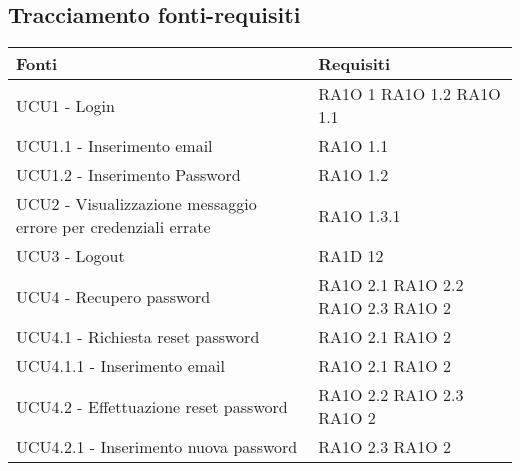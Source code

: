 \subsection{Tracciamento fonti-requisiti}
      \begin{center}
      \bgroup
      \def\arraystretch{1.8}
      \begin{longtable}{ | p{5cm} | p{5cm} |}
    
      \cellcolor[gray]{0.9} \textbf{Fonti} & \cellcolor[gray]{0.9} \textbf{Requisiti} \\ \hline       
            UCU1 - Login &  RA1O 1 \newline  RA1O 1.2 \newline  RA1O 1.1 \newline  \\ \hline      
            UCU1.1 - Inserimento email &  RA1O 1.1 \newline  \\ \hline      
            UCU1.2 - Inserimento Password &  RA1O 1.2 \newline  \\ \hline      
            UCU2 - Visualizzazione messaggio errore per credenziali errate &  RA1O 1.3.1 \newline  \\ \hline      
            UCU3 - Logout &  RA1D 12 \newline  \\ \hline      
            UCU4 - Recupero password &  RA1O 2.1 \newline  RA1O 2.2 \newline  RA1O 2.3 \newline  RA1O 2  \newline  \\ \hline      
            UCU4.1 - Richiesta reset password &  RA1O 2.1 \newline  RA1O 2  \newline  \\ \hline      
            UCU4.1.1 - Inserimento email &  RA1O 2.1 \newline  RA1O 2  \newline  \\ \hline      
            UCU4.2 - Effettuazione reset password &  RA1O 2.2 \newline  RA1O 2.3 \newline  RA1O 2  \newline  \\ \hline      
            UCU4.2.1 - Inserimento nuova password &  RA1O 2.3 \newline  RA1O 2  \newline  \\ \hline      

\end{longtable}
\end{center}
